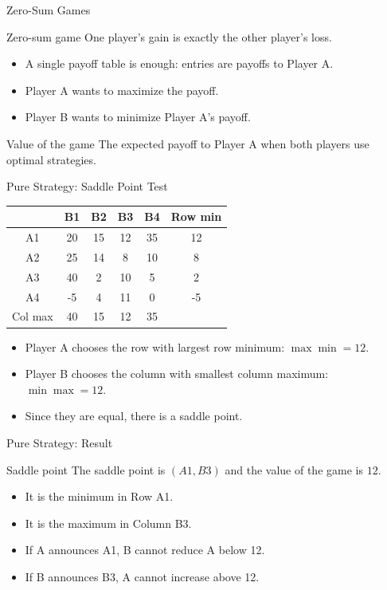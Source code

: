 \documentclass[10pt,aspectratio=169]{beamer}
\begin{document}
\begin{frame}{Zero-Sum Games}
\begin{block}{Zero-sum game}
One player's gain is exactly the other player's loss.
\end{block}
\vspace{0.2cm}
\begin{itemize}
  \item A single payoff table is enough: entries are payoffs to Player A.
  \item Player A wants to maximize the payoff.
  \item Player B wants to minimize Player A's payoff.
\end{itemize}
\vspace{0.2cm}
\begin{block}{Value of the game}
The expected payoff to Player A when both players use optimal strategies.
\end{block}
\end{frame}

\begin{frame}{Pure Strategy: Saddle Point Test}
\begin{center}
\begin{tabular}{c c c c c c}
 & B1 & B2 & B3 & B4 & Row min\\
\midrule
A1 & 20 & 15 & 12 & 35 & 12\\
A2 & 25 & 14 & 8 & 10 & 8\\
A3 & 40 & 2 & 10 & 5 & 2\\
A4 & -5 & 4 & 11 & 0 & -5\\
\midrule
Col max & 40 & 15 & 12 & 35 & \\
\end{tabular}
\end{center}
\vspace{0.2cm}
\begin{itemize}
  \item Player A chooses the row with largest row minimum: $\max \min = 12$.
  \item Player B chooses the column with smallest column maximum: $\min \max = 12$.
  \item Since they are equal, there is a saddle point.
\end{itemize}
\end{frame}

\begin{frame}{Pure Strategy: Result}
\begin{block}{Saddle point}
The saddle point is $(A1,B3)$ and the value of the game is $12$.
\end{block}
\vspace{0.2cm}
\begin{itemize}
  \item It is the minimum in Row A1.
  \item It is the maximum in Column B3.
  \item If A announces A1, B cannot reduce A below 12.
  \item If B announces B3, A cannot increase above 12.
\end{itemize}
\end{frame}
\end{document}
